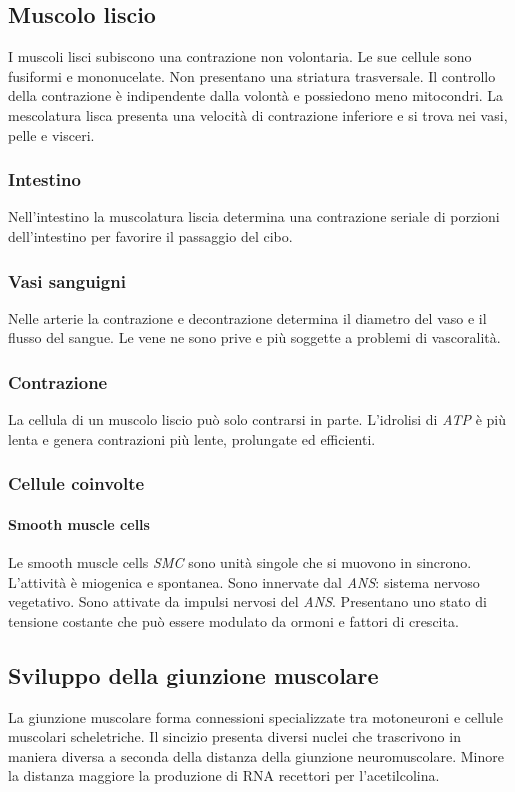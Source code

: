 	\subsection{Muscolo liscio}
	I muscoli lisci subiscono una contrazione non volontaria.
	Le sue cellule sono fusiformi e mononucelate.
	Non presentano una striatura trasversale.
	Il controllo della contrazione \`e indipendente dalla volont\`a e possiedono meno mitocondri.
	La mescolatura lisca presenta una velocit\`a di contrazione inferiore e si trova nei vasi, pelle e visceri.
	
		\subsubsection{Intestino}
		Nell'intestino la muscolatura liscia determina una contrazione seriale di porzioni dell'intestino per favorire il passaggio del cibo.

		\subsubsection{Vasi sanguigni}
		Nelle arterie la contrazione e decontrazione determina il diametro del vaso e il flusso del sangue.
		Le vene ne sono prive e pi\`u soggette a problemi di vascoralit\`a.

		\subsubsection{Contrazione}
		La cellula di un muscolo liscio pu\`o solo contrarsi in parte.
		L'idrolisi di \emph{ATP} \`e pi\`u lenta e genera contrazioni pi\`u lente, prolungate ed efficienti.

		\subsubsection{Cellule coinvolte}

			\paragraph{Smooth muscle cells}
			Le smooth muscle cells \emph{SMC} sono unit\`a singole che si muovono in sincrono.
			L'attivit\`a \`e miogenica e spontanea.
			Sono innervate dal \emph{ANS}: sistema nervoso vegetativo.
			Sono attivate da impulsi nervosi del \emph{ANS}.
			Presentano uno stato di tensione costante che pu\`o essere modulato da ormoni e fattori di crescita.

	\subsection{Sviluppo della giunzione muscolare}
	La giunzione muscolare forma connessioni specializzate tra motoneuroni e cellule muscolari scheletriche.
	Il sincizio presenta diversi nuclei che trascrivono in maniera diversa a seconda della distanza della giunzione neuromuscolare.
	Minore la distanza maggiore la produzione di RNA recettori per l'acetilcolina.

